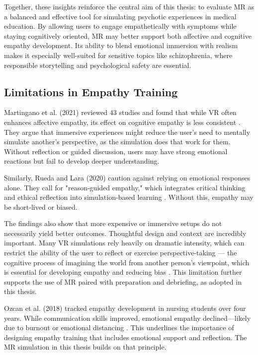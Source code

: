 Together, these insights reinforce the central aim of this thesis: to evaluate MR as a balanced and effective tool for simulating psychotic experiences in medical education. By allowing users to engage empathetically with symptoms while staying cognitively oriented, MR may better support both affective and cognitive empathy development. Its ability to blend emotional immersion with realism makes it especially well-suited for sensitive topics like schizophrenia, where responsible storytelling and psychological safety are essential.


\subsection{Limitations in Empathy Training}

Martingano et al. (2021) reviewed 43 studies and found that while VR often enhances affective empathy, its effect on cognitive empathy is less consistent \cite{Martingano2021}. They argue that immersive experiences might reduce the user's need to mentally simulate another's perspective, as the simulation does that work for them. Without reflection or guided discussion, users may have strong emotional reactions but fail to develop deeper understanding.

Similarly, Rueda and Lara (2020) caution against relying on emotional responses alone. They call for "reason-guided empathy," which integrates critical thinking and ethical reflection into simulation-based learning \cite{Rueda2020}. Without this, empathy may be short-lived or biased.

The findings also show that more expensive or immersive setups do not necessarily yield better outcomes. Thoughtful design and context are incredibly important. Many VR simulations rely heavily on dramatic intensity, which can restrict the ability of the user to reflect or exercise perspective-taking — the cognitive process of imagining the world from another person’s viewpoint, which is essential for developing empathy and reducing bias \cite{Batson2009}. This limitation further supports the use of MR paired with preparation and debriefing, as adopted in this thesis.

Ozcan et al. (2018) tracked empathy development in nursing students over four years. While communication skills improved, emotional empathy declined—likely due to burnout or emotional distancing \cite{Ozcan2018}. This underlines the importance of designing empathy training that includes emotional support and reflection. The MR simulation in this thesis builds on that principle.

